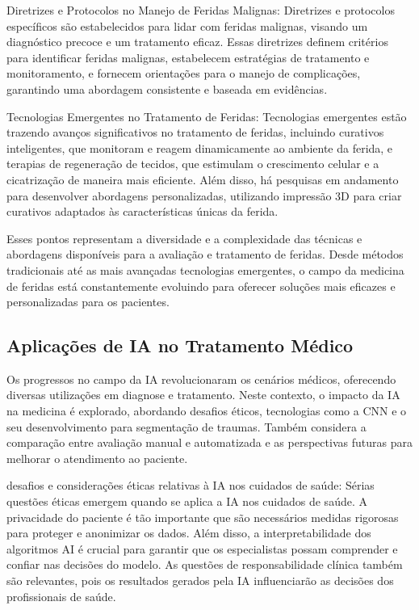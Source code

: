 Diretrizes e Protocolos no Manejo de Feridas Malignas: Diretrizes e protocolos específicos são estabelecidos para lidar com feridas malignas, visando um diagnóstico precoce e um tratamento eficaz. Essas diretrizes definem critérios para identificar feridas malignas, estabelecem estratégias de tratamento e monitoramento, e fornecem orientações para o manejo de complicações, garantindo uma abordagem consistente e baseada em evidências.

Tecnologias Emergentes no Tratamento de Feridas: Tecnologias emergentes estão trazendo avanços significativos no tratamento de feridas, incluindo curativos inteligentes, que monitoram e reagem dinamicamente ao ambiente da ferida, e terapias de regeneração de tecidos, que estimulam o crescimento celular e a cicatrização de maneira mais eficiente. Além disso, há pesquisas em andamento para desenvolver abordagens personalizadas, utilizando impressão 3D para criar curativos adaptados às características únicas da ferida.

Esses pontos representam a diversidade e a complexidade das técnicas e abordagens disponíveis para a avaliação e tratamento de feridas. Desde métodos tradicionais até as mais avançadas tecnologias emergentes, o campo da medicina de feridas está constantemente evoluindo para oferecer soluções mais eficazes e personalizadas para os pacientes.

\subsection{Aplicações de IA no Tratamento Médico}

Os progressos no campo da \ac{IA } revolucionaram os cenários médicos, oferecendo diversas utilizações em diagnose e tratamento. Neste contexto, o impacto da \ac{IA } na medicina é explorado, abordando desafios éticos, tecnologias como a \ac{CNN } e o seu desenvolvimento para segmentação de traumas. Também considera a comparação entre avaliação manual e automatizada e as perspectivas futuras para melhorar o atendimento ao paciente.

desafios e considerações éticas relativas à \ac{IA} nos cuidados de saúde: Sérias questões éticas emergem quando se aplica a \ac{IA} nos cuidados de saúde. A privacidade do paciente é tão importante que são necessários medidas rigorosas para proteger e anonimizar os dados. Além disso, a interpretabilidade dos algoritmos \ac{AI} é crucial para garantir que os especialistas possam comprender e confiar nas decisões do modelo. As questões de responsabilidade clínica também são relevantes, pois os resultados gerados pela \ac{IA } influenciarão as decisões dos profissionais de saúde.

